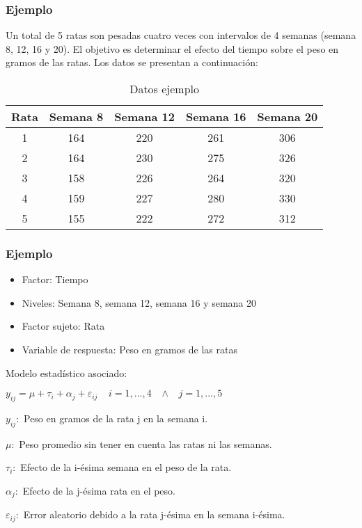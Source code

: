 \documentclass[12pt]{beamer}
\begin{document}
\begin{frame}
\frametitle{Ejemplo}
Un total de 5 ratas son pesadas cuatro veces con intervalos de 4 semanas (semana 8, 12, 16 y 20). El objetivo es determinar el efecto del tiempo sobre el peso en gramos de las ratas. Los datos se presentan a continuación:
\begin{table}[htbp]
  \centering
\resizebox{12cm}{!} {
\begin{tabular}{|c|c|c|c|c|}
\hline 
\textbf{Rata} & \textbf{Semana 8} & \textbf{Semana 12} & \textbf{Semana 16} & \textbf{Semana 20}\\ 
\hline 
1 & 164 &220& 261& 306\\
2 & 164 &230& 275& 326\\
3 &158 &226& 264& 320\\
4 &159 &227& 280& 330\\
5 &155 &222 &272& 312\\
\hline 
\end{tabular} 
}
\caption{Datos ejemplo}
\label{tab:addlabel}%
\end{table}%
\end{frame}

\begin{frame}
\frametitle{Ejemplo}
\begin{itemize}
\item Factor: Tiempo
\item Niveles: Semana 8, semana 12, semana 16 y semana 20
\item Factor sujeto: Rata
\item Variable de respuesta: Peso en gramos de las ratas
\end{itemize}
Modelo estadístico asociado:
\begin{center}
$y_{ij}=\mu+\tau_i+\alpha_j+\varepsilon_{ij} \;\;\;\; i=1,...,4 \;\;\;  \wedge \;\;\; j=1,...,5$
\end{center}
$y_{ij}:$ Peso en gramos de la rata j en la semana i.

$\mu:$ Peso promedio sin tener en cuenta las ratas ni las semanas.

$\tau_i:$ Efecto de la i-ésima semana en el peso de la rata.

$\alpha_j:$ Efecto de la j-ésima rata en el peso.

$\varepsilon_{ij}:$ Error aleatorio debido a la rata j-ésima en la semana i-ésima.

\end{frame}
\end{document}
